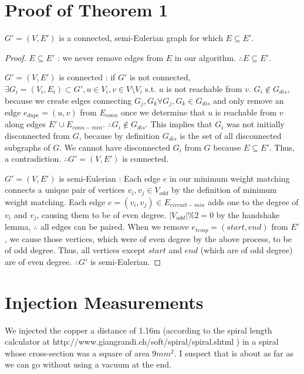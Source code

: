 \newpage
\appendix

\section{Proof of Theorem 1}

\begin{theorem} \label{thm:graphness}
 $G' = (V, E')$ is a connected, semi-Eulerian graph for which $E \subseteq E'$.
\end{theorem}

\begin{proof}
$E \subseteq E'$ : we never remove edges from $E$ in our algorithm.  $\therefore E \subseteq E'$.

$G' = (V, E')$ is connected : if $G'$ is not connected, $\exists G_i = (V_i, E_i) \subset G', u \in V_i, v\in V \setminus V_i$ s.t. $u$ is not reachable from $v$.  $G_i \not\in G_{dis}$, because we create edges connecting $G_j, G_k \forall G_j, G_k \in G_{dis}$ and only remove an edge $e_{dupe} = (u, v)$ from $E_{conn}$ once we determine that $u$ is reachable from $v$ along edges $E' \cup E_{conn-min}$.  $\therefore G_i \not\in G_{dis}$.  This implies that $G_i$ was not initially disconnected from $G$, because by definition $G_{dis}$ is the set of all disconnected subgraphs of $G$.  We cannot have disconnected $G_i$ from $G$ because $E \subseteq E'$.  Thus, a contradiction.  $\therefore G' = (V, E')$ is connected.

$G' = (V, E')$ is semi-Eulerian : Each edge $e$ in our minimum weight matching connects a unique pair of vertices $v_i, v_j \in V_{odd}$ by the definition of minimum weight matching.  Each edge $e = (v_i, v_j) \in E_{circuit-min}$ adds one to the degree of $v_i$ and $v_j$, causing them to be of even degree. $|V_{odd}| \% 2 = 0$ by the handshake lemma, $\therefore$ all edges can be paired.  When we remove $e_{temp} = (start, end)$ from $E'$, we cause those vertices, which were of even degree by the above process, to be of odd degree.  Thus, all vertices except $start$ and $end$ (which are of odd degree) are of even degree.  $\therefore G'$ is semi-Eulerian.
\end{proof}

\section{Injection Measurements}
We injected the copper a distance of 1.16m (according to the spiral length calculator at http://www.giangrandi.ch/soft/spiral/spiral.shtml ) in a spiral whose cross-section was a square of area $9mm^2$.  I suspect that is about as far as we can go without using a vacuum at the end.

